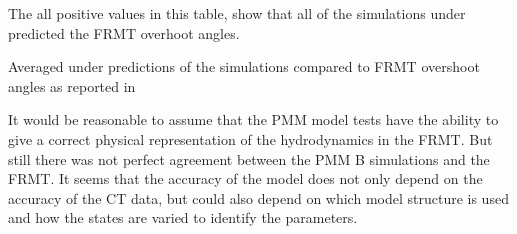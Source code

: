 The all positive values in this table, show that all of the simulations under predicted the FRMT overhoot angles. 
\begin{table}[h]
    \centering
    \caption{Averaged under predictions of the simulations compared to FRMT overshoot angles as reported in \cite{liuPredictionsShipManeuverability2018}}
    \label{tab:liu2018}
\end{table}
It would be reasonable to assume that the PMM model tests have the ability to give a correct physical representation of the hydrodynamics in the FRMT. But still there was not perfect agreement between the PMM B simulations and the FRMT. It seems that the accuracy of the model does not only depend on the accuracy of the CT data, but could also depend on which model structure is used and how the states are varied to identify the parameters.